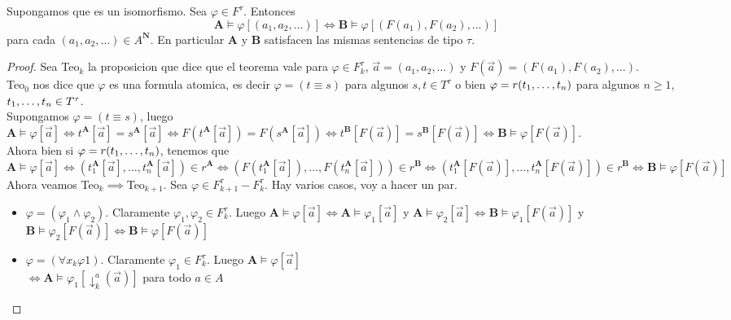 \begin{lemma}
  Supongamos que  es un isomorfismo. Sea $\varphi \in F^\tau$. Entonces
  $$
  \mathbf{A}\models\varphi[(a_1, a_2, \dots)] \iff \mathbf{B}\models\varphi[(F(a_1), F(a_2),\dots)]
  $$
  para cada $(a_1, a_2, \dots) \in A^\mathbf{N}$. En particular $\mathbf{A}$ y $\mathbf{B}$ satisfacen las mismas
  sentencias de tipo $\tau$.
\end{lemma}
\begin{proof}
  Sea Teo$_k$ la proposicion que dice que el teorema vale para $\varphi\in F_k^\tau$, $\vec{a} = (a_1, a_2, \dots)$ y $F(\vec{a}) = (F(a_1), F(a_2), \dots)$.\\
  Teo$_0$ nos dice que $\varphi$ es una formula atomica, es decir $\varphi = (t\equiv s)$ para algunos $s,t\in T^\tau$ o bien $\varphi = r(t_{1}, \dots, t_{n})$ para algunos $n \geq 1$, $t_{1}, \dots, t_{n} \in T^\tau$.\\
  Supongamos $\varphi = (t\equiv s)$, luego $\mathbf{A}\models\varphi[\vec{a}] \iff t^\mathbf{A}[\vec{a}] = s^\mathbf{A}[\vec{a}] \iff F(t^\mathbf{A}[\vec{a}]) = F(s^\mathbf{A}[\vec{a}]) \iff t^\mathbf{B}[F(\vec{a})] = s^\mathbf{B}[F(\vec{a})] \iff \mathbf{B}\models\varphi[F(\vec{a})]$.\\
  Ahora bien si $\varphi = r(t_{1}, \dots, t_{n})$, tenemos que $\mathbf{A}\models\varphi[\vec{a}] \iff (t_1^\mathbf{A}[\vec{a}], \dots, t_n^\mathbf{A}[\vec{a}]) \in r^\mathbf{A} \iff (F(t_1^\mathbf{A}[\vec{a}]), \dots, F(t_n^\mathbf{A}[\vec{a}])) \in r^\mathbf{B} \iff (t_1^\mathbf{A}[F(\vec{a})], \dots, t_n^\mathbf{A}[F(\vec{a})]) \in r^\mathbf{B} \iff \mathbf{B}\models\varphi[F(\vec{a})]$\\
  Ahora veamos Teo$_{k} \implies $Teo$_{k+1}$. Sea $\varphi \in F_{k+1}^\tau - F_k^\tau$. Hay varios casos, voy a hacer un par.
  \begin{itemize}
    \item $\varphi = (\varphi_1\land\varphi_2)$. Claramente $\varphi_1, \varphi_2\in F_k^\tau$. Luego $\mathbf{A}\models\varphi[\vec{a}] \iff \mathbf{A}\models\varphi_1[\vec{a}]$ y $\mathbf{A}\models\varphi_2[\vec{a}] \iff \mathbf{B}\models\varphi_1[F(\vec{a})]$ y $\mathbf{B}\models\varphi_2[F(\vec{a})] \iff \mathbf{B}\models\varphi[F(\vec{a})]$
    \item $\varphi = (\forall x_k \varphi1)$. Claramente $\varphi_1 \in F_k^\tau$. Luego $\mathbf{A}\models\varphi[\vec{a}]$\\
    $\iff \mathbf{A}\models\varphi_1[\downarrow_k^a(\vec{a})]$ para todo $a \in A$\\

\end{itemize}
\end{proof}
